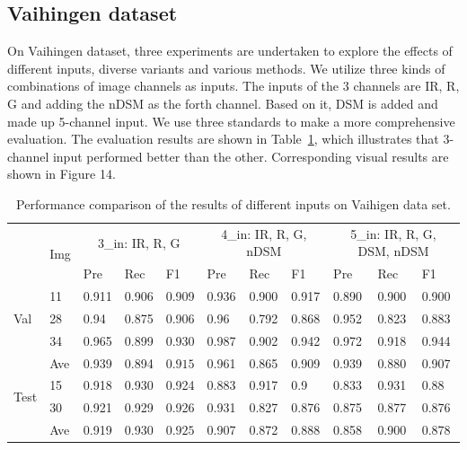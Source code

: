 \subsection{Vaihingen dataset}
On Vaihingen dataset, three experiments are undertaken to explore the effects of different inputs, diverse variants and various methods. We utilize  three kinds of combinations of image channels as inputs. The inputs of the 3 channels are IR, R, G and adding the nDSM as the forth channel. Based on it, DSM is added and made up 5-channel input. We use three standards to make a more comprehensive evaluation. The evaluation results are shown in Table~\ref{table:vaihigen-comp}, which illustrates that 3-channel input performed better than the other. Corresponding visual results are shown in Figure 14.



\begin{table}[htbp]
\caption {Performance comparison of the results of different inputs on Vaihigen data set. }
\label{table:vaihigen-comp}
\centering
\begin{tabular}{p{1.1cm}<{\centering}|p{1.1cm}<{\centering}|p{1.1cm}<{\centering}|p{1.1cm}<{\centering}|p{1.1cm}<{\centering}|p{1.1cm}<{\centering}|p{1.1cm}<{\centering}|p{1.1cm}<{\centering}|p{1.1cm}<{\centering}|p{1.1cm}<{\centering}|p{1.1cm}<{\centering}}
\hline
&\multirow{2}{*}{Img}&\multicolumn{3}{c}{3\_in: IR, R, G} &\multicolumn{3}{|c|}{4\_in: IR, R, G, nDSM}&\multicolumn{3}{c}{5\_in: IR, R, G, DSM, nDSM}\\
\cline{3-11}
&& Pre &Rec & F1 &Pre &Rec &F1&Pre &Rec &F1\\
\hline
\multirow{3}{*}{Val}&11&0.911&0.906&0.909&0.936&0.900&0.917&0.890&0.900&0.900\\
&28&0.94&0.875&0.906&0.96&0.792&0.868&0.952&0.823&0.883\\
&34&0.965&0.899&0.930&0.987&0.902&0.942&0.972&0.918&0.944\\
&Ave&0.939&0.894&$\bm{0.915}$&0.961&0.865&0.909&0.939&0.880&0.907\\
\hline
\multirow{2}{*}{Test}&15&0.918&0.930&0.924&0.883&0.917&0.9&0.833&0.931&0.88\\
&30&0.921&0.929&0.926&0.931&0.827&0.876&0.875&0.877&0.876\\
&Ave&0.919&0.930&$\bm{0.925}$&0.907&0.872&0.888&0.858&0.900&0.878\\
\hline
\end{tabular}
\end{table}

